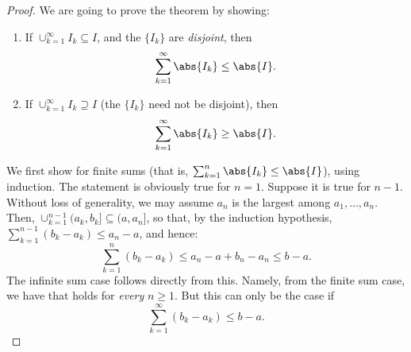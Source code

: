 \begin{proof}
	We are going to prove the theorem by showing:
	\begin{enumerate}
		\item If $\cup_{k=1}^\infty I_k \subseteq I$, and the $\{I_k\}$ are \textit{disjoint}, then
		      \begin{equation}
			      \sum_{k=1}^\infty \abs{I_k} \le \abs{I}.
			      \label{eq:IntervalSub}
		      \end{equation}
		\item If $\cup_{k=1}^\infty I_k \supseteq I$ (the $\{I_k\}$ need not be disjoint), then
		      \begin{equation}
			      \sum_{k=1}^\infty \abs{I_k} \ge \abs{I}.
			      \label{eq:IntervalSuper}
		      \end{equation}
	\end{enumerate}

	We first show  for finite sums (that is, $\sum_{k=1}^n \abs{I_k} \le \abs{I}$), using induction. The statement is obviously true for $n=1$. Suppose it is true for $n-1$. Without loss of generality, we may assume $a_n$ is the largest among $a_1, \dots, a_n$. Then, $\cup_{k=1}^{n-1} (a_k, b_k] \subseteq (a, a_n]$, so that, by the induction hypothesis, $\sum_{k=1}^{n-1} (b_k - a_k) \le a_n - a$, and hence:
	\begin{equation}
		\sum_{k=1}^n (b_k - a_k) \le a_n - a + b_n - a_n \le b - a.
		\label{eq:FiniteSumBound}
	\end{equation}
	The infinite sum case follows directly from this. Namely, from the finite sum case, we have that  holds for \textit{every} $n \ge 1$. But this can only be the case if
	\begin{equation*}
		\sum_{k=1}^\infty (b_k - a_k) \le b - a.
	\end{equation*}


\end{proof}
